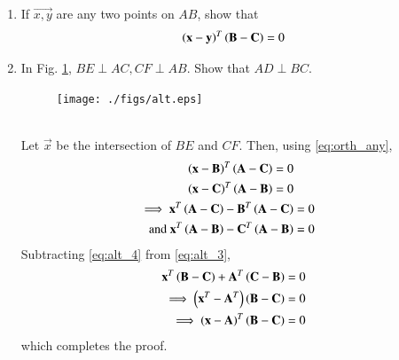 \documentclass[journal,12pt,twocolumn]{IEEEtran}
\renewcommand\thesection{\arabic{section}}
\begin{document}
\begin{enumerate}[label=\thesection.\arabic*
,ref=\thesection.\theenumi]
\begin{equation}
\end{equation}
%
\item If $\vec{x,y}$ are any two points on $AB$, show that 
\begin{equation}
\label{eq:orth_any}
\left(\mathbf{x}-\mathbf{y}\right)^T\left(\mathbf{B}-\mathbf{C}\right) = 0
\end{equation}
%
\item In Fig. \ref{fig:alt}, $BE \perp AC, CF \perp AB$.  Show that $AD \perp BC$.
\begin{figure}[!hb]
\centering
\texttt{[image: ./figs/alt.eps]}
\caption{}
\label{fig:alt}
\end{figure}
\\
\solution Let $\vec{x}$ be the intersection of $BE$ and $CF$. Then, using 
\eqref{eq:orth_any},
\begin{align}
\label{eq:alt_1}
\begin{split}
\left(\mathbf{x}-\mathbf{B}\right)^T
\left(\mathbf{A}-\mathbf{C}\right) &= 0
\\
\left(\mathbf{x}-\mathbf{C}\right)^T
\left(\mathbf{A}-\mathbf{B}\right) &=0
\end{split}
\\
\label{eq:alt_3}
\implies \mathbf{x}^T\left(\mathbf{A}-\mathbf{C}\right)-\mathbf{B}^T\left(\mathbf{A}-\mathbf{C}\right) &= 0
\\
\text{and }\mathbf{x}^T\left(\mathbf{A}-\mathbf{B}\right)-\mathbf{C}^T\left(\mathbf{A}-\mathbf{B}\right) &= 0
\label{eq:alt_4}
\end{align}
%
Subtracting \eqref{eq:alt_4} from \eqref{eq:alt_3},
\begin{align}
\mathbf{x}^T\left(\mathbf{B}-\mathbf{C}\right) + \mathbf{A}^T\left(\mathbf{C}-\mathbf{B}\right) &= 0
\\
\implies \left(\mathbf{x}^T - \mathbf{A}^T\right)\left(\mathbf{B}-\mathbf{C}\right)  &= 0
\\
\implies \left(\mathbf{x} - \mathbf{A}\right)^T\left(\mathbf{B}-\mathbf{C}\right)  &= 0
\end{align}
%
which completes the proof.
\end{enumerate}
%
\end{document}
